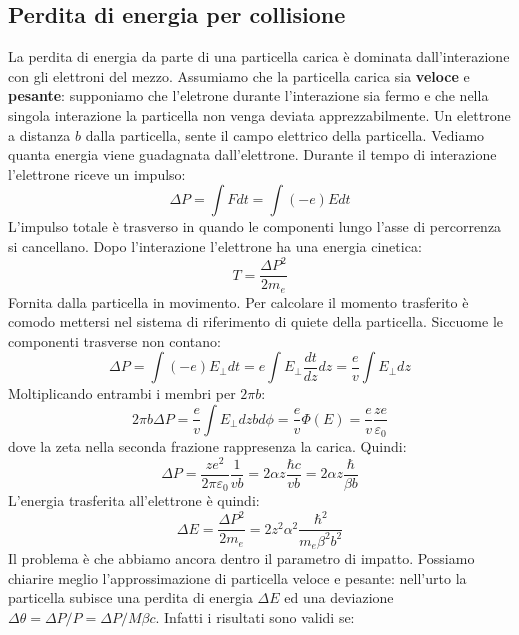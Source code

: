 \subsection{Perdita di energia per collisione}
La perdita di energia da parte di una particella carica è dominata dall'interazione con gli elettroni del mezzo. Assumiamo che la particella carica sia \textbf{veloce} e \textbf{pesante}: supponiamo che l'eletrone durante l'interazione sia fermo e che nella singola interazione la particella non venga deviata apprezzabilmente. Un elettrone a distanza $b$ dalla particella, sente il campo elettrico della particella. Vediamo quanta energia viene guadagnata dall'elettrone. Durante il tempo di interazione l'elettrone riceve un impulso:
\begin{equation*}
    \Delta P=\int F dt=\int (-e)E dt
\end{equation*}
L'impulso totale è trasverso in quando le componenti lungo l'asse di percorrenza si cancellano. Dopo l'interazione l'elettrone ha una energia cinetica:
\begin{equation*}
    T=\frac{\Delta P^2}{2m_e}
\end{equation*}
Fornita dalla particella in movimento. Per calcolare il momento trasferito è comodo mettersi nel sistema di riferimento di quiete della particella. Siccuome le componenti trasverse non contano:
\begin{equation*}
    \Delta P=\int (-e)E_\perp dt=e\int E_\perp \frac{dt}{dz}dz=\frac{e}{v}\int E_\perp dz
\end{equation*}
Moltiplicando entrambi i membri per $2\pi b$:
\begin{equation*}
    2\pi b \Delta P=\frac{e}{v}\int E_\perp dzbd\phi=\frac{e}{v}\Phi(E)=\frac{e}{v}\frac{ze}{\varepsilon_0}
\end{equation*}
dove la zeta nella seconda frazione rappresenza la carica. Quindi:
\begin{equation*}
    \Delta P=\frac{ze^2}{2\pi\varepsilon_0}\frac{1}{vb}=2\alpha z\frac{\hbar c}{vb}=2\alpha z \frac{\hbar}{\beta b}
\end{equation*}
L'energia trasferita all'elettrone è quindi:
\begin{equation*}
    \Delta E=\frac{\Delta P^2}{2m_e}=2z^2\alpha^2\frac{\hbar^2}{m_e\beta^2b^2}
\end{equation*}
Il problema è che abbiamo ancora dentro il parametro di impatto. Possiamo chiarire meglio l'approssimazione di particella veloce e pesante: nell'urto la particella subisce una perdita di energia $\Delta E$ ed una deviazione $\Delta \theta=\Delta P/P=\Delta P/M\beta c$. Infatti i risultati sono validi se:
